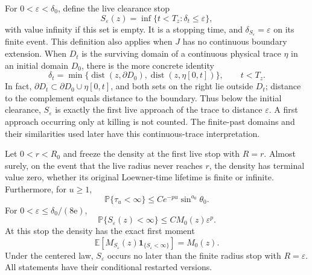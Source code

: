 For $0<\varepsilon<\delta_0$, define the live clearance stop
\[
 S_\varepsilon(z)=\inf\{t<T_z:\delta_t\le\varepsilon\},
\]
with value infinity if this set is empty.  It is a stopping time, and
$\delta_{S_\varepsilon}=\varepsilon$ on its finite event.  This definition
also applies when $J$ has no continuous boundary extension.
When $D_t$ is the surviving domain of a continuous physical trace
$\eta$ in an initial domain $D_0$, there is the more concrete identity
\begin{equation}\label{ll:trace-clearance}
 \delta_t=\min\{\operatorname{dist}(z,\partial D_0),
                  \operatorname{dist}(z,\eta[0,t])\},\qquad t<T_z.
\end{equation}
In fact, $\partial D_t\subset\partial D_0\cup\eta[0,t]$, and both sets
on the right lie outside $D_t$; distance to the complement equals
distance to the boundary.  Thus below the initial clearance,
$S_\varepsilon$ is exactly the first live approach of the trace to
distance $\varepsilon$.  A first approach occurring only at killing
is not counted.  The finite-past domains and their similarities used
later have this continuous-trace interpretation.

\begin{lemma}\label{ll:approach}
Let $0<r<R_0$ and freeze the density at the first live stop with $R=r$.
Almost surely, on the event that the live radius never reaches $r$, the
density has terminal value zero,
whether its original Loewner-time lifetime is finite or infinite.
Furthermore, for $u\ge1$,
\begin{equation}
 \mathbb P\{\tau_u<\infty\}
 \le C e^{-pu}\sin^{a_0}\theta_0.
 \label{ll:radius-approach}
\end{equation}
For $0<\varepsilon\le\delta_0/(8\mathrm e)$,
\begin{equation}
 \mathbb P\{S_\varepsilon(z)<\infty\}
       \le C M_0(z)\varepsilon^p.
 \label{ll:euclidean-approach}
\end{equation}
At this stop the density has the exact first moment
\begin{equation}\label{ll:clearance-first-moment}
 \mathbb E\!\left[M_{S_\varepsilon}(z)
          \mathbf1_{\{S_\varepsilon<\infty\}}\right]=M_0(z).
\end{equation}
Under the centered law, $S_\varepsilon$ occurs no later than the finite
radius stop with $R=\varepsilon$.
All statements have their conditional restarted versions.
\end{lemma}

